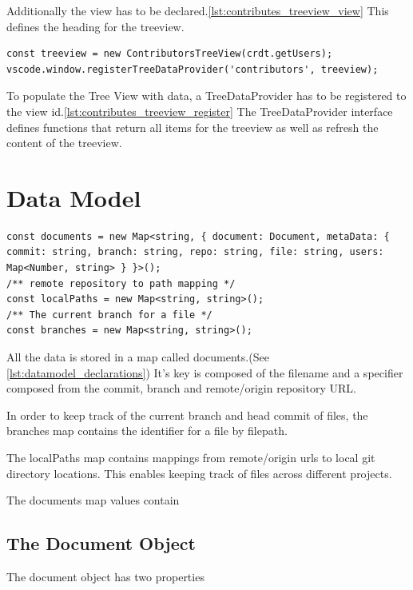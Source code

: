Additionally the view has to be declared.\ref{lst:contributes_treeview_view} This defines the heading for the treeview.

\begin{lstlisting}[label={lst:contributes_treeview_register} caption=Define Tree View Data Provider]
const treeview = new ContributorsTreeView(crdt.getUsers);
vscode.window.registerTreeDataProvider('contributors', treeview);
\end{lstlisting}

To populate the Tree View with data, a TreeDataProvider has to be registered to the view id.\ref{lst:contributes_treeview_register}
The TreeDataProvider interface defines functions that return all items for the treeview as well as refresh the content of the treeview.

\section{Data Model}

\begin{lstlisting}[label={lst:datamodel_declarations}, caption=data model declarations]
const documents = new Map<string, { document: Document, metaData: { commit: string, branch: string, repo: string, file: string, users: Map<Number, string> } }>();
/** remote repository to path mapping */
const localPaths = new Map<string, string>();
/** The current branch for a file */
const branches = new Map<string, string>();
\end{lstlisting}

All the data is stored in a map called documents.(See \ref{lst:datamodel_declarations})
It's key is composed of the filename and a specifier composed from the commit, branch and remote/origin repository URL.

In order to keep track of the current branch and head commit of files, the branches map contains the identifier for a file by filepath.

The localPaths map contains mappings from remote/origin urls to local git directory locations.
This enables keeping track of files across different projects.


The documents map values contain

\subsection{The Document Object}

The document object has two properties

